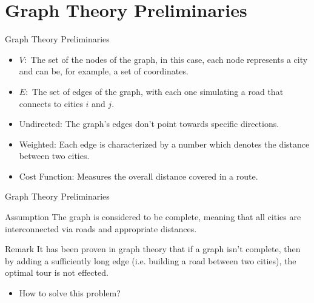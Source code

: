 \documentclass[aspectratio=169,xcolor=dvipsnames, t]{beamer}
\begin{document}
\section{Graph Theory Preliminaries}
\begin{frame}[noframenumbering]{Graph Theory Preliminaries}
	\vspace{-5mm}
	\begin{itemize}
		\item<2-> \( V: \) The set of the nodes of the graph, in this case, each node represents a city and can be, for example, a set of coordinates.
		\item<3-> \( E: \) The set of edges of the graph, with each one simulating a road that connects to cities \(i\) and \( j\).
		\item<4-> Undirected: The graph's edges don't point towards specific directions.
		\item<5-> Weighted: Each edge is characterized by a number which denotes the distance between two cities.
		\item<6-> Cost Function: Measures the overall distance covered in a route.
	\end{itemize}
\end{frame}

\begin{frame}{Graph Theory Preliminaries}
	\vspace{-5mm}
	\onslide<1->\begin{block}{Assumption}
		The graph is considered to be complete, meaning that all cities are interconnected via roads and appropriate distances.
	\end{block}

	\begin{alertblock}{Remark}
		It has been proven in graph theory that if a graph isn't complete, then by adding a sufficiently long edge (i.e. building a road between two cities), the optimal tour is not effected.
	\end{alertblock}

	\begin{itemize}
		\item<3-> How to solve this problem?
	\end{itemize}
\end{frame}

\end{document}
